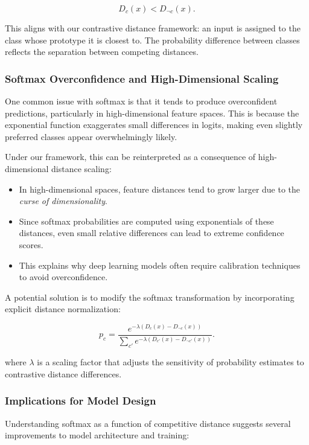 \documentclass[12pt]{article}
\begin{document}
\[
D_c(x) < D_{\neg c}(x).
\]

This aligns with our contrastive distance framework: an input is assigned to the class whose prototype it is closest to. The probability difference between classes reflects the separation between competing distances.

\subsubsection{Softmax Overconfidence and High-Dimensional Scaling}

One common issue with softmax is that it tends to produce overconfident predictions, particularly in high-dimensional feature spaces. This is because the exponential function exaggerates small differences in logits, making even slightly preferred classes appear overwhelmingly likely.

Under our framework, this can be reinterpreted as a consequence of high-dimensional distance scaling:

\begin{itemize}
    \item In high-dimensional spaces, feature distances tend to grow larger due to the \textit{curse of dimensionality}.
    \item Since softmax probabilities are computed using exponentials of these distances, even small relative differences can lead to extreme confidence scores.
    \item This explains why deep learning models often require calibration techniques to avoid overconfidence.
\end{itemize}

A potential solution is to modify the softmax transformation by incorporating explicit distance normalization:

\[
p_c = \frac{e^{-\lambda (D_c(x) - D_{\neg c}(x))}}{\sum_{c'} e^{-\lambda (D_{c'}(x) - D_{\neg c'}(x))}}.
\]

where \( \lambda \) is a scaling factor that adjusts the sensitivity of probability estimates to contrastive distance differences.

\subsubsection{Implications for Model Design}

Understanding softmax as a function of competitive distance suggests several improvements to model architecture and training:
\end{document}
